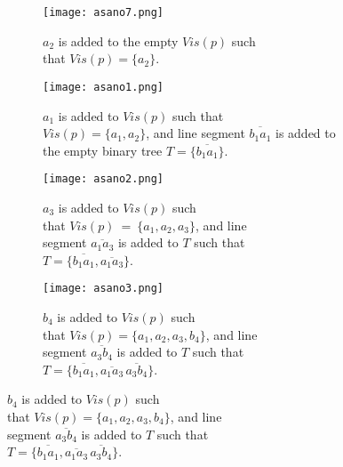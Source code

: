 \begin{figure}[h!]
	\centering
	\begin{subfigure}{0.45\linewidth}
		\texttt{[image: asano7.png]}
		\caption{$a_2$ is added to the empty $Vis(p)$ such \\ that $Vis(p) = \{a_2\}$.}
		\label{fig:asano1}
	\end{subfigure}
	\begin{subfigure}{0.45\linewidth}
		\texttt{[image: asano1.png]}
		\caption{$a_1$ is added to $Vis(p)$ such that \\ $Vis(p) = \{a_1, a_2\}$, and line segment $\overline{b_1a_1}$ is added to the empty binary tree $T = \{\overline{b_1a_1}\}$.}
	\end{subfigure}
	\begin{subfigure}{0.45\linewidth}
		\texttt{[image: asano2.png]}
		\caption{$a_3$ is added to $Vis(p)$ such \\ that $Vis(p)~=~\{a_1, a_2, a_3\}$,  and line \\ segment $\overline{a_1a_3}$ is added to $T$ such that \\ $T = \{\overline{b_1a_1}, \overline{a_1a_3}\}$.}
	\end{subfigure}
	\begin{subfigure}{0.45\linewidth}
		\texttt{[image: asano3.png]}
		\caption{$b_4$ is added to $Vis(p)$ such \\ that $Vis(p)=\{a_1, a_2, a_3, b_4\}$, and line \\ segment $\overline{a_3b_4}$ is added to $T$ such that \\ $T = \{\overline{b_1a_1}, \overline{a_1a_3}\, \overline{a_3b_4}\}$.}
	\end{subfigure}
\end{figure}
